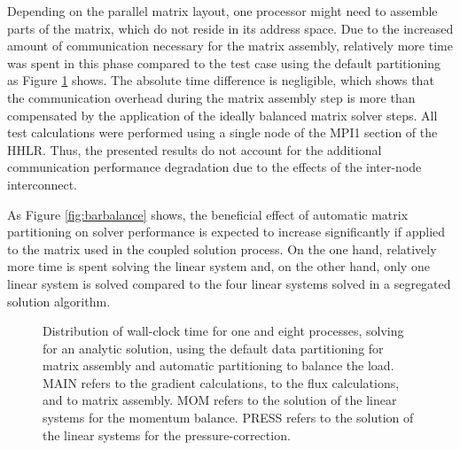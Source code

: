 Depending on the parallel matrix layout, one processor might need to assemble parts of the matrix, which do not reside in its address space. Due to the increased amount of communication necessary for the matrix assembly, relatively more time was spent in this phase compared to the test case using the default partitioning as Figure \ref{fig:distseg} shows. The absolute time difference is negligible, which shows that the communication overhead during the matrix assembly step is more than compensated by the application of the ideally balanced matrix solver steps. All test calculations were performed using a single node of the MPI1 section of the HHLR. Thus, the presented results do not account for the additional communication performance degradation due to the effects of the inter-node interconnect.

As Figure \ref{fig:barbalance} shows, the beneficial effect of automatic matrix partitioning on solver performance is expected to increase significantly if applied to the matrix used in the coupled solution process. On the one hand, relatively more time is spent solving the linear system and, on the other hand, only one linear system is solved compared to the four linear systems solved in a segregated solution algorithm.

\begin{figure}[h!]
\hfil
\caption{Distribution of wall-clock time for one and eight processes, solving for an analytic solution, using the default data partitioning for matrix assembly and automatic partitioning to balance the load. MAIN refers to the gradient calculations, to the flux calculations, and to matrix assembly. MOM refers to the solution of the linear systems for the momentum balance. PRESS refers to the solution of the linear systems for the pressure-correction.}
\label{fig:distseg}
\end{figure}


